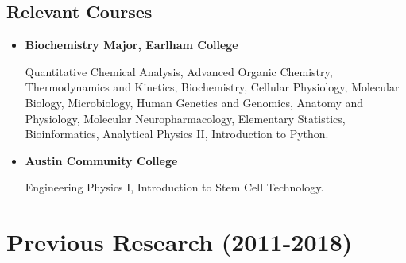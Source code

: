 \documentclass[10pt,letterpaper,sans]{moderncv}        %
\begin{document}



\subsection{Relevant Courses}

\vspace{5pt}

\begin{itemize}

\item{\textbf{Biochemistry Major, Earlham College} \textit{}

\vspace{3pt}

\small{Quantitative Chemical Analysis, Advanced Organic Chemistry, Thermodynamics and Kinetics, Biochemistry, Cellular Physiology, Molecular Biology, Microbiology, Human Genetics and Genomics, Anatomy and Physiology, Molecular Neuropharmacology, Elementary Statistics, Bioinformatics, Analytical Physics II, Introduction to Python.}}

\vspace{6pt}

\item{\textbf{Austin Community College} \textit{}

\vspace{3pt}

\small{Engineering Physics I, Introduction to Stem Cell Technology.}}


\end{itemize}

\section{Previous Research (2011-2018)}

\vspace{6pt}
\end{document}
